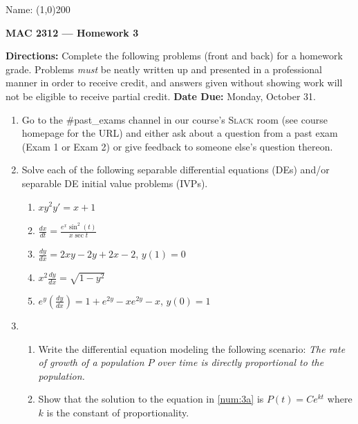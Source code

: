 \documentclass[12 pt]{article}
\newcommand{\hint}[1]{\hspace{0.5in}\textbf{Hint}: #1}
\begin{document}
\begin{flushright}Name: \line(1,0){200}\end{flushright}
\begin{center}
\Large{\textbf{MAC 2312 --- Homework 3}}
\end{center}
\textbf{Directions:} Complete the following problems (front and back) for a homework grade. Problems \textit{must} be neatly written up and presented in a professional manner in order to receive credit, and answers given without showing work will not be eligible to receive partial credit. \textbf{Date Due:} Monday, October 31.
\vspace{0.125in}
\begin{enumerate}[leftmargin=0in, rightmargin=-0.25in]
	\item Go to the \#past\_exams channel in our course's \textsc{Slack} room (see course homepage for the URL) and either ask about a question from a past exam (Exam 1 or Exam 2) or give feedback to someone else's question thereon.%
	\item Solve each of the following separable differential equations (DEs) and/or separable DE initial value problems (IVPs).
		\begin{enumerate}[itemsep=0.25in]
			\item $xy^2y'=x+1$
			\item $\frac{dx}{dt}=\frac{e^x\sin^2(t)}{x\sec{t}}$
			\item $\frac{dy}{dx}=2xy-2y+2x-2$, $y(1)=0$
			\item $x^2\frac{dy}{dx}=\sqrt{1-y^2}$
			\item $e^y\left(\frac{dy}{dx}\right)=1+e^{2y}-xe^{2y}-x$, $y(0)=1$
		\end{enumerate}
		\item \begin{enumerate}
			\item \label{num:3a} Write the differential equation modeling the following scenario: \textit{The rate of growth of a population $P$ over time is directly proportional to the population.}
			\item \label{num:3b} Show that the solution to the equation in \ref{num:3a} is $P(t)=Ce^{kt}$ where $k$ is the constant of proportionality.

\end{enumerate}
\end{enumerate}
\end{document}
